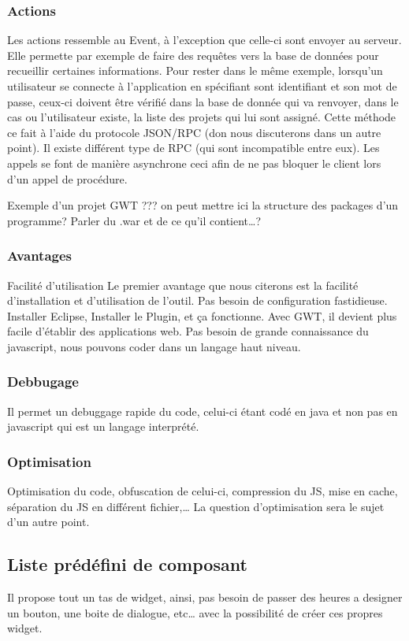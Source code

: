 \subsubsection{Actions}
Les actions ressemble au Event, à l'exception que celle-ci sont envoyer au serveur. Elle permette par exemple de faire des requêtes vers la base de données pour recueillir certaines informations. Pour rester dans le même exemple, lorsqu'un utilisateur se connecte à l'application en spécifiant sont identifiant et son mot de passe, ceux-ci doivent être vérifié dans la base de donnée qui va renvoyer, dans le cas ou l'utilisateur existe, la liste des projets qui lui sont assigné. Cette méthode ce fait à l'aide du protocole JSON/RPC (don nous discuterons dans un autre point). Il existe différent type de RPC (qui sont incompatible entre eux). Les appels se font de manière asynchrone ceci afin de ne pas bloquer le client lors d'un appel de procédure.

	Exemple d'un projet GWT
??? on peut mettre ici la structure des packages d'un programme? Parler du .war et de ce qu'il contient…?
	

\subsubsection{	Avantages}
Facilité d'utilisation
Le premier avantage que nous citerons est la facilité d'installation et d'utilisation de l'outil. Pas besoin de configuration fastidieuse. Installer Eclipse, Installer le Plugin, et ça fonctionne.
Avec GWT, il devient plus facile d'établir des applications web. Pas besoin de grande connaissance du javascript, nous pouvons coder dans un langage haut niveau.

\subsubsection{Debbugage}
Il permet un debuggage rapide du code, celui-ci étant codé en java et non pas en javascript qui est un langage interprété.

\subsubsection{Optimisation}
Optimisation du code, obfuscation de celui-ci, compression du JS, mise en cache, séparation du JS en différent fichier,… La question d'optimisation sera le sujet d'un autre point.

\subsection{Liste prédéfini de composant}
Il propose tout un tas de widget, ainsi, pas besoin de passer des heures a designer un bouton, une boite de dialogue, etc… avec la possibilité de créer ces propres widget.

